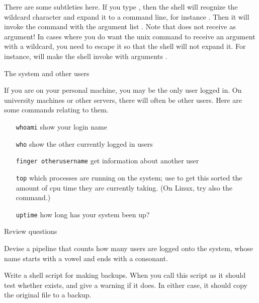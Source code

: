 There are some subtleties here. If you type , then the shell
will reognize the wildcard character and expand it to a command line,
for instance . Then it will invoke the 
command with the argument list . Note that  does
not receive  as argument! In cases where you do want the unix
command to receive an argument with a wildcard, you need to escape it
so that the shell will not expand it. For instance,  will make the shell invoke  with arguments .

 {The system and other users}

If you are on your personal machine, you may be the only user logged
in. On university machines or other servers, there will often be other
users. Here are some commands relating to them.

\begin{itemize}
\item [{\tt whoami}] show your login name
\item [{\tt who}] show the other currently logged in users
\item [{\tt finger otherusername}] get information about another user
\item [{\tt top}] which processes are running on the system; use
   to get this sorted the amount of cpu time they are
  currently taking. (On Linux, try also the  command.)
\item [{\tt uptime}] how long has your system been up?
\end{itemize}


 {Review questions}

\begin{istc}
\begin{exercise}
    Devise a pipeline that counts how many users are logged onto
    the system, whose name starts with a vowel and ends with a
    consonant.
\end{exercise}
\end{istc}

\begin{exercise}
Write a shell script for making backups. When you call this script as
 it should test whether  exists,
and give a warning if it does. In either case, it should copy the 
original file to a backup.
\end{exercise}



